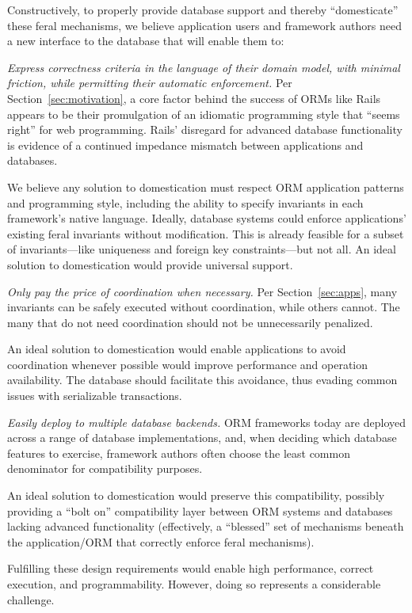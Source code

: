 Constructively, to properly provide database support and thereby
``domesticate'' these feral mechanisms, we believe application users
and framework authors need a new interface to the database that will
enable them to:
\begin{interfaceenumerate} 
\item \textit{Express correctness criteria in the language of their
    domain model, with minimal friction, while permitting their
    automatic enforcement.} Per Section~\ref{sec:motivation}, a core
  factor behind the success of ORMs like Rails appears to be their
  promulgation of an idiomatic programming style that ``seems right''
  for web programming. Rails' disregard for advanced database
  functionality is evidence of a continued impedance mismatch between
  applications and databases.  \vspace{.5em}

  We believe any solution to domestication must respect ORM
  application patterns and programming style, including the ability to
  specify invariants in each framework's native language. Ideally,
  database systems could enforce applications' existing feral
  invariants without modification. This is already feasible for a
  subset of invariants---like uniqueness and foreign key
  constraints---but not all. An ideal solution to domestication would
  provide universal support.

\item \textit{Only pay the price of coordination when necessary.} Per
  Section~\ref{sec:apps}, many invariants can be safely executed
  without coordination, while others cannot. The many that do not need
  coordination should not be unnecessarily penalized. \vspace{.5em}

  An ideal solution to domestication would enable applications to
  avoid coordination whenever possible would improve performance and
  operation availability. The database should facilitate this
  avoidance, thus evading common issues with serializable
  transactions.

\item \textit{Easily deploy to multiple database backends.}  ORM
  frameworks today are deployed across a range of database
  implementations, and, when deciding which database features to
  exercise, framework authors often choose the least common
  denominator for compatibility purposes.  \vspace{.5em}

  An ideal solution to domestication would preserve this
  compatibility, possibly providing a ``bolt on'' compatibility layer
  between ORM systems and databases lacking advanced functionality
  (effectively, a ``blessed'' set of mechanisms beneath the
  application/ORM that correctly enforce feral mechanisms).

\end{interfaceenumerate}
Fulfilling these design requirements would enable high performance,
correct execution, and programmability. However, doing so represents a
considerable challenge.

